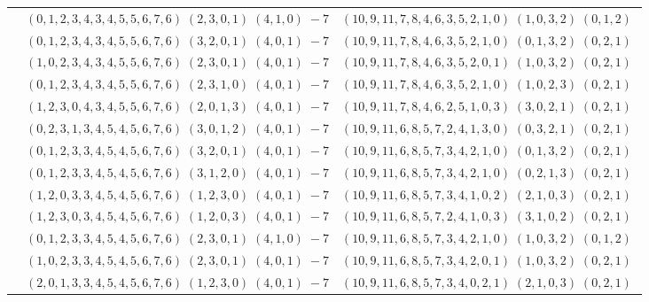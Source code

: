 \documentclass[11pt]{article}
\begin{document}
\begin{longtable}[l]{|c|c|c|}
 \cline{2-3} 
 & $(0 ,1 ,2 ,3 ,4 ,3 ,4 ,5 ,5 ,6 ,7 ,6) \;(2 ,3 ,0 ,1) \;(4 ,1 ,0) \;-7$ & $(10 ,9 ,11 ,7 ,8 ,4 ,6 ,3 ,5 ,2 ,1 ,0) \;(1 ,0 ,3 ,2) \;(0 ,1 ,2) \;$\\ 
 \cline{2-3} 
 & $(0 ,1 ,2 ,3 ,4 ,3 ,4 ,5 ,5 ,6 ,7 ,6) \;(3 ,2 ,0 ,1) \;(4 ,0 ,1) \;-7$ & $(10 ,9 ,11 ,7 ,8 ,4 ,6 ,3 ,5 ,2 ,1 ,0) \;(0 ,1 ,3 ,2) \;(0 ,2 ,1) \;$\\ 
 \cline{2-3} 
 & $(1 ,0 ,2 ,3 ,4 ,3 ,4 ,5 ,5 ,6 ,7 ,6) \;(2 ,3 ,0 ,1) \;(4 ,0 ,1) \;-7$ & $(10 ,9 ,11 ,7 ,8 ,4 ,6 ,3 ,5 ,2 ,0 ,1) \;(1 ,0 ,3 ,2) \;(0 ,2 ,1) \;$\\ 
 \cline{2-3} 
 & $(0 ,1 ,2 ,3 ,4 ,3 ,4 ,5 ,5 ,6 ,7 ,6) \;(2 ,3 ,1 ,0) \;(4 ,0 ,1) \;-7$ & $(10 ,9 ,11 ,7 ,8 ,4 ,6 ,3 ,5 ,2 ,1 ,0) \;(1 ,0 ,2 ,3) \;(0 ,2 ,1) \;$\\ 
 \cline{2-3} 
 & $(1 ,2 ,3 ,0 ,4 ,3 ,4 ,5 ,5 ,6 ,7 ,6) \;(2 ,0 ,1 ,3) \;(4 ,0 ,1) \;-7$ & $(10 ,9 ,11 ,7 ,8 ,4 ,6 ,2 ,5 ,1 ,0 ,3) \;(3 ,0 ,2 ,1) \;(0 ,2 ,1) \;$\\ 
 \cline{2-3} 
 & $(0 ,2 ,3 ,1 ,3 ,4 ,5 ,4 ,5 ,6 ,7 ,6) \;(3 ,0 ,1 ,2) \;(4 ,0 ,1) \;-7$ & $(10 ,9 ,11 ,6 ,8 ,5 ,7 ,2 ,4 ,1 ,3 ,0) \;(0 ,3 ,2 ,1) \;(0 ,2 ,1) \;$\\ 
 \cline{2-3} 
 & $(0 ,1 ,2 ,3 ,3 ,4 ,5 ,4 ,5 ,6 ,7 ,6) \;(3 ,2 ,0 ,1) \;(4 ,0 ,1) \;-7$ & $(10 ,9 ,11 ,6 ,8 ,5 ,7 ,3 ,4 ,2 ,1 ,0) \;(0 ,1 ,3 ,2) \;(0 ,2 ,1) \;$\\ 
 \cline{2-3} 
 & $(0 ,1 ,2 ,3 ,3 ,4 ,5 ,4 ,5 ,6 ,7 ,6) \;(3 ,1 ,2 ,0) \;(4 ,0 ,1) \;-7$ & $(10 ,9 ,11 ,6 ,8 ,5 ,7 ,3 ,4 ,2 ,1 ,0) \;(0 ,2 ,1 ,3) \;(0 ,2 ,1) \;$\\ 
 \cline{2-3} 
 & $(1 ,2 ,0 ,3 ,3 ,4 ,5 ,4 ,5 ,6 ,7 ,6) \;(1 ,2 ,3 ,0) \;(4 ,0 ,1) \;-7$ & $(10 ,9 ,11 ,6 ,8 ,5 ,7 ,3 ,4 ,1 ,0 ,2) \;(2 ,1 ,0 ,3) \;(0 ,2 ,1) \;$\\ 
 \cline{2-3} 
 & $(1 ,2 ,3 ,0 ,3 ,4 ,5 ,4 ,5 ,6 ,7 ,6) \;(1 ,2 ,0 ,3) \;(4 ,0 ,1) \;-7$ & $(10 ,9 ,11 ,6 ,8 ,5 ,7 ,2 ,4 ,1 ,0 ,3) \;(3 ,1 ,0 ,2) \;(0 ,2 ,1) \;$\\ 
 \cline{2-3} 
 & $(0 ,1 ,2 ,3 ,3 ,4 ,5 ,4 ,5 ,6 ,7 ,6) \;(2 ,3 ,0 ,1) \;(4 ,1 ,0) \;-7$ & $(10 ,9 ,11 ,6 ,8 ,5 ,7 ,3 ,4 ,2 ,1 ,0) \;(1 ,0 ,3 ,2) \;(0 ,1 ,2) \;$\\ 
 \cline{2-3} 
 & $(1 ,0 ,2 ,3 ,3 ,4 ,5 ,4 ,5 ,6 ,7 ,6) \;(2 ,3 ,0 ,1) \;(4 ,0 ,1) \;-7$ & $(10 ,9 ,11 ,6 ,8 ,5 ,7 ,3 ,4 ,2 ,0 ,1) \;(1 ,0 ,3 ,2) \;(0 ,2 ,1) \;$\\ 
 \cline{2-3} 
 & $(2 ,0 ,1 ,3 ,3 ,4 ,5 ,4 ,5 ,6 ,7 ,6) \;(1 ,2 ,3 ,0) \;(4 ,0 ,1) \;-7$ & $(10 ,9 ,11 ,6 ,8 ,5 ,7 ,3 ,4 ,0 ,2 ,1) \;(2 ,1 ,0 ,3) \;(0 ,2 ,1) \;$\\ 

\end{longtable}
\end{document}
